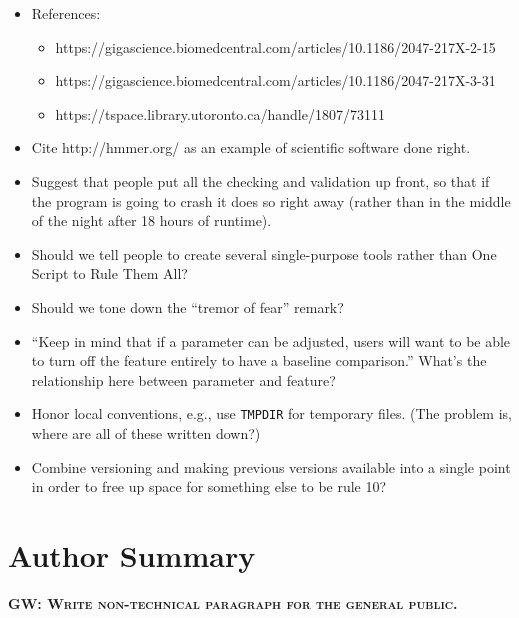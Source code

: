 \documentclass[10pt,letterpaper]{article}
\newcommand{\fixme}[2]{\textsc{\textbf{{#1}: {#2}}}}
\begin{document}
\begin{itemize}

\item
References:
  \begin{itemize}
  \item https://gigascience.biomedcentral.com/articles/10.1186/2047-217X-2-15
  \item https://gigascience.biomedcentral.com/articles/10.1186/2047-217X-3-31
  \item https://tspace.library.utoronto.ca/handle/1807/73111
  \end{itemize}

\item
Cite http://hmmer.org/ as an example of scientific software done right.

\item
Suggest that people put all the checking and validation up front,
so that if the program is going to crash it does so right away
(rather than in the middle of the night after 18 hours of runtime).

\item
Should we tell people to create several single-purpose tools
rather than One Script to Rule Them All?

\item
Should we tone down the ``tremor of fear'' remark?

\item
``Keep in mind that if a parameter can be adjusted,
users will want to be able to turn off the feature entirely to have a baseline comparison.''
What's the relationship here between parameter and feature?

\item
Honor local conventions,
e.g.,
use \texttt{TMPDIR} for temporary files.
(The problem is,
where are all of these written down?)

\item
Combine versioning and making previous versions available into a single point
in order to free up space for something else to be rule 10?

\end{itemize}

\section*{Author Summary}

\fixme{GW}{Write non-technical paragraph for the general public.}

\linenumbers
\end{document}
